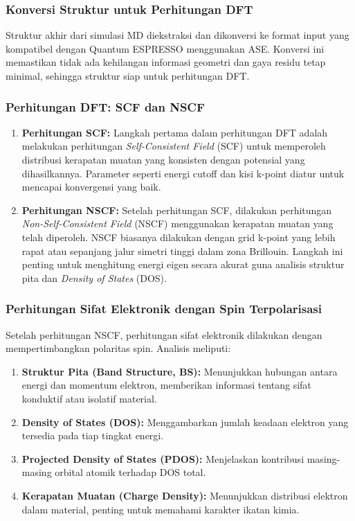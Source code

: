 \subsubsection*{Konversi Struktur untuk Perhitungan DFT}
\label{sec:structure_conversion}
Struktur akhir dari simulasi MD diekstraksi dan dikonversi ke format input yang kompatibel dengan Quantum ESPRESSO menggunakan ASE. Konversi ini memastikan tidak ada kehilangan informasi geometri dan gaya residu tetap minimal, sehingga struktur siap untuk perhitungan DFT. \subsubsection*{Perhitungan DFT: SCF dan NSCF}
\label{sec:dft_calculations}
\begin{enumerate}
    \item \textbf{Perhitungan SCF:} Langkah pertama dalam perhitungan DFT adalah melakukan perhitungan \textit{Self-Consistent Field} (SCF) untuk memperoleh distribusi kerapatan muatan yang konsisten dengan potensial yang dihasilkannya. Parameter seperti energi cutoff dan kisi k-point diatur untuk mencapai konvergensi yang baik. \item \textbf{Perhitungan NSCF:} Setelah perhitungan SCF, dilakukan perhitungan \textit{Non-Self-Consistent Field} (NSCF) menggunakan kerapatan muatan yang telah diperoleh. NSCF biasanya dilakukan dengan grid k-point yang lebih rapat atau sepanjang jalur simetri tinggi dalam zona Brillouin. Langkah ini penting untuk menghitung energi eigen secara akurat guna analisis struktur pita dan \textit{Density of States} (DOS). \end{enumerate}

\subsubsection*{Perhitungan Sifat Elektronik dengan Spin Terpolarisasi}
\label{sec:electronic_properties}
Setelah perhitungan NSCF, perhitungan sifat elektronik dilakukan dengan mempertimbangkan polaritas spin. Analisis meliputi:
\begin{enumerate}
    \item \textbf{Struktur Pita (Band Structure, BS):} Menunjukkan hubungan antara energi dan momentum elektron, memberikan informasi tentang sifat konduktif atau isolatif material. \item \textbf{Density of States (DOS):} Menggambarkan jumlah keadaan elektron yang tersedia pada tiap tingkat energi. \item \textbf{Projected Density of States (PDOS):} Menjelaskan kontribusi masing-masing orbital atomik terhadap DOS total. \item \textbf{Kerapatan Muatan (Charge Density):} Menunjukkan distribusi elektron dalam material, penting untuk memahami karakter ikatan kimia.
\end{enumerate}